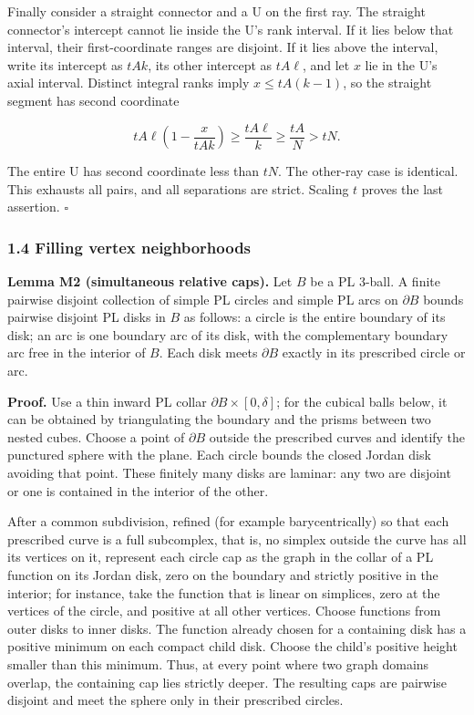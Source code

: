 \documentclass[
  11pt,
]{article}
\begin{document}
Finally consider a straight connector and a U on the first ray. The
straight connector's intercept cannot lie inside the U's rank interval.
If it lies below that interval, their first-coordinate ranges are
disjoint. If it lies above the interval, write its intercept as \(tAk\),
its other intercept as \(tA\ell\), and let \(x\) lie in the U's axial
interval. Distinct integral ranks imply \(x\leq tA(k-1)\), so the
straight segment has second coordinate

\[
tA\ell\left(1-\frac{x}{tAk}\right)
\geq\frac{tA\ell}{k}
\geq\frac{tA}{N}
>tN.
\]

The entire U has second coordinate less than \(tN\). The other-ray case
is identical. This exhausts all pairs, and all separations are strict.
Scaling \(t\) proves the last assertion. \(\square\)

\subsubsection{1.4 Filling vertex
neighborhoods}\label{filling-vertex-neighborhoods}

\textbf{Lemma M2 (simultaneous relative caps).} Let \(B\) be a PL
3-ball. A finite pairwise disjoint collection of simple PL circles and
simple PL arcs on \(\partial B\) bounds pairwise disjoint PL disks in
\(B\) as follows: a circle is the entire boundary of its disk; an arc is
one boundary arc of its disk, with the complementary boundary arc free
in the interior of \(B\). Each disk meets \(\partial B\) exactly in its
prescribed circle or arc.

\textbf{Proof.} Use a thin inward PL collar
\(\partial B\times[0,\delta]\); for the cubical balls below, it can be
obtained by triangulating the boundary and the prisms between two nested
cubes. Choose a point of \(\partial B\) outside the prescribed curves
and identify the punctured sphere with the plane. Each circle bounds the
closed Jordan disk avoiding that point. These finitely many disks are
laminar: any two are disjoint or one is contained in the interior of the
other.

After a common subdivision, refined (for example barycentrically) so
that each prescribed curve is a full subcomplex, that is, no simplex
outside the curve has all its vertices on it, represent each circle cap
as the graph in the collar of a PL function on its Jordan disk, zero on
the boundary and strictly positive in the interior; for instance, take
the function that is linear on simplices, zero at the vertices of the
circle, and positive at all other vertices. Choose functions from outer
disks to inner disks. The function already chosen for a containing disk
has a positive minimum on each compact child disk. Choose the child's
positive height smaller than this minimum. Thus, at every point where
two graph domains overlap, the containing cap lies strictly deeper. The
resulting caps are pairwise disjoint and meet the sphere only in their
prescribed circles.
\end{document}
